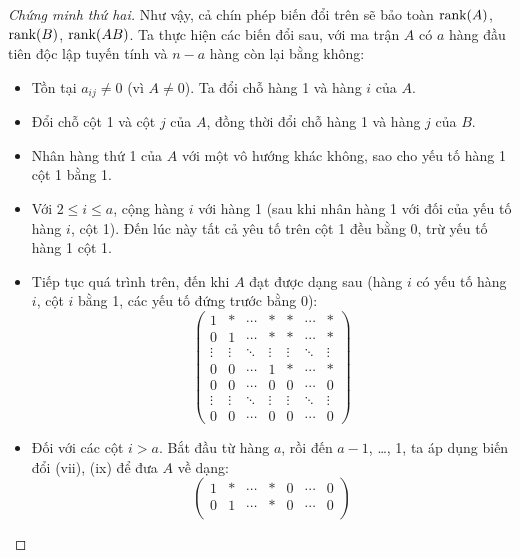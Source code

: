 \begin{proof}[Chứng minh thứ hai]
    Như vậy, cả chín phép biến đổi trên sẽ bảo toàn $\text{rank}(A)$, $\text{rank}(B)$, $\text{rank}(AB)$. Ta thực hiện các biến đổi sau, với ma trận $A$ có $a$ hàng đầu tiên độc lập tuyến tính và $n - a$ hàng còn lại bằng không:
    \begin{itemize}
        \item Tồn tại $a_{ij}\ne 0$ (vì $A\ne 0$). Ta đổi chỗ hàng 1 và hàng $i$ của $A$.
        \item Đổi chỗ cột 1 và cột $j$ của $A$, đồng thời đổi chỗ hàng 1 và hàng $j$ của $B$.
        \item Nhân hàng thứ 1 của $A$ với một vô hướng khác không, sao cho yếu tố hàng 1 cột 1 bằng 1.
        \item Với $2\le i\le a$, cộng hàng $i$ với hàng 1 (sau khi nhân hàng 1 với đối của yếu tố hàng $i$, cột 1). Đến lúc này tất cả yêu tố trên cột 1 đều bằng 0, trừ yếu tố hàng 1 cột 1.
        \item Tiếp tục quá trình trên, đến khi $A$ đạt được dạng sau (hàng $i$ có yếu tố hàng $i$, cột $i$ bằng 1, các yếu tố đứng trước bằng 0):
              \[
                  \begin{pmatrix}
                      1      & *      & \cdots & *      & *      & \cdots & *      \\
                      0      & 1      & \cdots & *      & *      & \cdots & *      \\
                      \vdots & \vdots & \ddots & \vdots & \vdots & \ddots & \vdots \\
                      0      & 0      & \cdots & 1      & *      & \cdots & *      \\
                      0      & 0      & \cdots & 0      & 0      & \cdots & 0      \\
                      \vdots & \vdots & \ddots & \vdots & \vdots & \ddots & \vdots \\
                      0      & 0      & \cdots & 0      & 0      & \cdots & 0
                  \end{pmatrix}
              \]
        \item Đối với các cột $i > a$. Bắt đầu từ hàng $a$, rồi đến $a-1$, \ldots, 1, ta áp dụng biến đổi (vii), (ix) để đưa $A$ về dạng:
              \[
                  \begin{pmatrix}
                      1      & *      & \cdots & *      & 0      & \cdots & 0      \\
                      0      & 1      & \cdots & *      & 0      & \cdots & 0      \\

\end{pmatrix}\]
\end{itemize}
\end{proof}
